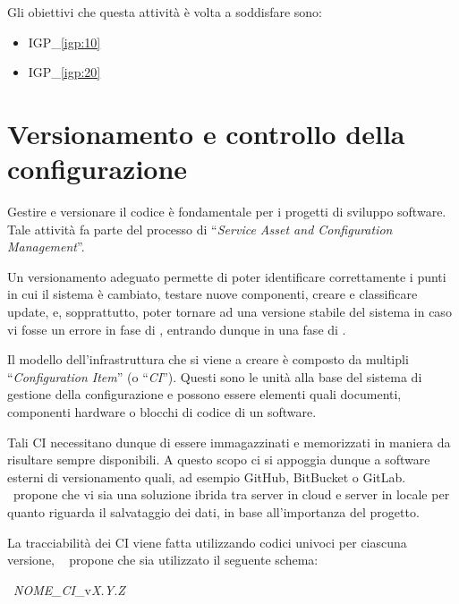 		Gli obiettivi che questa attività è volta a soddisfare sono:
		\begin{itemize}[noitemsep]
			\renewcommand\labelitemi{--}
			\item {\color{pantone}IGP\_\ref{igp:10}}
			\item {\color{pantone}IGP\_\ref{igp:20}}
		\end{itemize}

\newpage
\section{Versionamento e controllo della configurazione}\label{sec:configurazione}

	Gestire e versionare il codice è fondamentale per i progetti di sviluppo software.	
	Tale attività fa parte del processo di ``\textit{Service Asset and Configuration Management}''.
	
	Un versionamento adeguato permette di poter identificare correttamente i punti in cui il sistema è cambiato, testare nuove componenti, creare e classificare update, e, sopprattutto, poter tornare ad una versione stabile del sistema in caso vi fosse un errore in fase di \rollout, entrando dunque in una fase di \rollback.
	
	Il modello dell'infrastruttura che si viene a creare è composto da multipli ``\textit{Configuration Item}'' (o ``\textit{CI}'').
	Questi sono le unità alla base del sistema di gestione della configurazione e possono essere elementi quali documenti, componenti hardware o blocchi di codice di un software.
	
	Tali CI necessitano dunque di essere immagazzinati e memorizzati in maniera da risultare sempre disponibili.
	A questo scopo ci si appoggia dunque a software esterni di versionamento quali, ad esempio GitHub\cite{github}, BitBucket\cite{bitbucket} o GitLab\cite{gitlab}.
	\azienda~propone che vi sia una soluzione ibrida tra server in cloud e server in locale per quanto riguarda il salvataggio dei dati, in base all'importanza del progetto.
	
	La tracciabilità dei CI viene fatta utilizzando codici univoci per ciascuna versione, \azienda~ propone che sia utilizzato il seguente schema:
	
	\begin{center}
		\vspace{-2mm}
		{\Large~\textit{NOME\_CI}\_v\textit{X.Y.Z}}
		\vspace{-2mm}
	\end{center}
	
